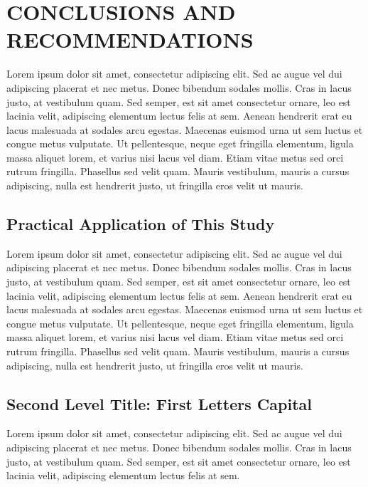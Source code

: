 \chapter{CONCLUSIONS AND RECOMMENDATIONS}\label{ch:ch6}

Lorem ipsum dolor sit amet, consectetur adipiscing elit. Sed ac augue vel dui 
a\-di\-pi\-scing pla\-ce\-rat et nec me\-tus. Donec bibendum sodales mollis. Cras in lacus 
justo, at vestibulum quam. Sed semper, est sit amet consectetur ornare, leo est 
lacinia velit, adipiscing elementum lectus felis at sem. Aenean hendrerit erat eu 
lacus malesuada at sodales arcu egestas. Maecenas euismod urna ut sem luctus et 
congue metus vulputate. Ut pellentesque, neque eget fringilla elementum, ligula 
massa aliquet lorem, et varius nisi lacus vel diam. Etiam vitae metus sed orci 
rutrum fringilla. Phasellus sed velit quam. Mauris vestibulum, mauris a cursus 
adipiscing, nulla est hendrerit justo, ut fringilla eros velit ut mauris.

\section{Practical Application of This Study}

Lorem ipsum dolor sit amet, consectetur adipiscing elit. Sed ac augue vel dui 
adipiscing placerat et nec metus. Donec bibendum sodales mollis. Cras in lacus 
justo, at vestibulum quam. Sed semper, est sit amet consectetur ornare, leo est 
lacinia velit, adipiscing elementum lectus felis at sem. Aenean hendrerit erat eu 
lacus malesuada at sodales arcu egestas. Maecenas euismod urna ut sem luctus et 
congue metus vulputate. Ut pellentesque, neque eget fringilla elementum, ligula 
massa aliquet lorem, et varius nisi lacus vel diam. Etiam vitae metus sed orci 
rutrum fringilla. Phasellus sed velit quam. Mauris vestibulum, mauris a cursus 
adipiscing, nulla est hendrerit justo, ut fringilla eros velit ut mauris.

\section{Second Level Title: First Letters Capital}

Lorem ipsum dolor sit amet, consectetur adipiscing elit. Sed ac augue vel dui 
adipiscing placerat et nec metus. Donec bibendum sodales mollis. Cras in lacus 
justo, at vestibulum quam. Sed semper, est sit amet consectetur ornare, leo est 
lacinia velit, adipiscing elementum lectus felis at sem. 

